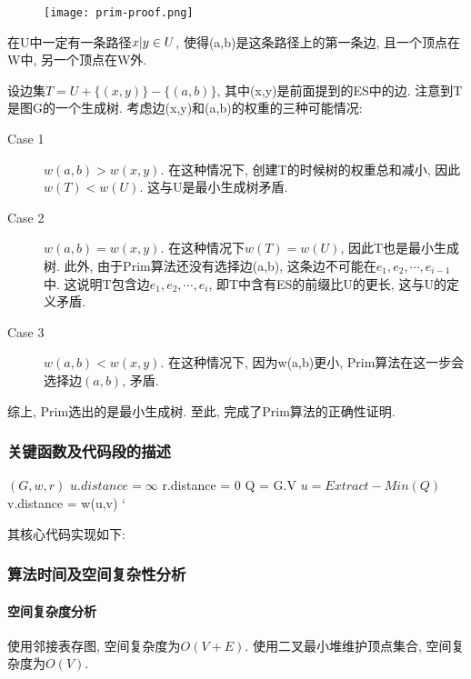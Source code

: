 \begin{wrapfigure}{r}{width=0.5\textwidth}
	\begin{center}
		\texttt{[image: prim-proof.png]}
	\end{center}
	\label{fig:prim-proof}
\end{wrapfigure}

在U中一定有一条路径$x\arrowvert y\in U$, 使得(a,b)是这条路径上的第一条边,
且一个顶点在W中, 另一个顶点在W外.

设边集$T=U+\{(x,y)\}-\{(a,b)\}$, 其中(x,y)是前面提到的ES中的边.
注意到T是图G的一个生成树. 考虑边(x,y)和(a,b)的权重的三种可能情况:
\begin{description}
	\item[Case 1]  $w(a,b) > w(x,y)$. 在这种情况下, 创建T的时候树的权重总和减小,
		因此$w(T) < w(U)$. 这与U是最小生成树矛盾.
	\item[Case 2] $w(a,b) = w(x,y)$. 在这种情况下$w(T)=w(U)$, 因此T也是最小生成树.
		此外, 由于Prim算法还没有选择边(a,b), 这条边不可能在$e_1,e_2,\cdots,
			e_{i-1}$中. 这说明T包含边$e_1,e_2,\cdots,e_i$, 即T中含有ES的前缀比U的更长,
		这与U的定义矛盾.
	\item[Case 3] $w(a,b)<w(x,y)$. 在这种情况下, 因为w(a,b)更小,
		Prim算法在这一步会选择边$(a,b)$, 矛盾.
\end{description}
综上, Prim选出的是最小生成树. 至此, 完成了Prim算法的正确性证明.

\subsubsection{关键函数及代码段的描述}
\begin{algorithm}
	\begin{algorithmic}{1}
		\Require $(G, w, r)$
		\State $u.distance = \infty$
		\EndFor
		\State r.distance = 0
		\State Q = G.V
		\State $u = Extract-Min(Q)$
		\State v.distance = w(u,v)
		\EndIf`
		\EndFor
		\EndWhile
	\end{algorithmic}
\end{algorithm}
其核心代码实现如下:


\subsubsection{算法时间及空间复杂性分析}
\paragraph{空间复杂度分析}
使用邻接表存图, 空间复杂度为$O(V+E)$. 使用二叉最小堆维护顶点集合,
空间复杂度为$O(V)$.

